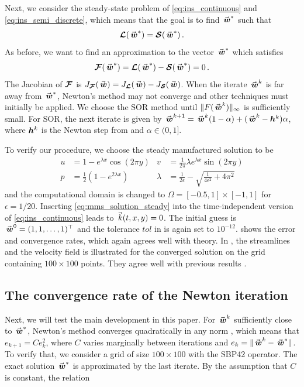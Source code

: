 Next, we consider the steady-state problem of \eqref{eq:ins_continuous} and \eqref{eq:ins_semi_discrete}, which means that the goal is to find $\wn^*$ such that
\begin{equation}
   \euln(\wn^*) = \satn(\wn^*)
   \, .
   \label{eq:ins_steady_state}
\end{equation}
As before, we want to find an approximation to the vector $\wn^*$ which satisfies
\begin{equation}
  \Fn (\wn^*) = \euln(\wn^*) - \satn(\wn^*) = 0  
  \, .
  \label{eq:F_steady_state}
\end{equation}
The Jacobian of $\bm{\mathcal{F}}$ is $J_{\Fn}(\wn) = J_{\euln}(\wn) - J_{\satn}(\wn)$. 
When the iterate $\wn^k$ is far away from $\wn^*$, Newton's method may not converge and other techniques must initially be applied. We choose the SOR method \cite{quarteroni2010numerical} 
until $\|F(\wn^k)\|_\infty$ is sufficiently small. For SOR, the next iterate is given by $\wn^{k+1} = \wn^k(1-\alpha) + (\wn^k - \hn^k)\alpha$, where $\bm{h}^k$ is the Newton step from  and $\alpha \in (0,1]$.

To verify our procedure, we choose the steady manufactured solution to be \cite{kovasznay1948laminar} 
\begin{equation}
  \begin{aligned}
    u & = 1-e^{\lambda x} \cos(2\pi y)
    & v & = \frac{1}{2 \pi}\lambda e^{\lambda x}\sin(2\pi y)
    \\
    p & = \frac{1}{2}\left(1 - e^{2\lambda x}\right)
    & \lambda & = \frac{1}{2 \epsilon} - \sqrt{\frac{1}{4 \epsilon^2} + 4 \pi^2}
 \end{aligned}
 \label{eq:mms_solution_steady}
\end{equation}
and the computational domain is changed to $\Omega = [-0.5,1]\times [-1,1]$ for $\epsilon = 1/20$. Inserting \eqref{eq:mms_solution_steady} into the time-independent version of \eqref{eq:ins_continuous} leads to $\vecs{k}(t,x,y) = 0$. The initial guess is $\wn^0 = (1,1, \dots, 1)^\top$ and the tolerance $tol$ in  is again set to $10^{-12}$. 
 shows the error and convergence rates, which again agrees well with theory. In , the streamlines and the velocity field is illustrated for the converged solution on the grid containing $100\times 100$ points. They agree well with previous results \cite{kovasznay1948laminar}. 

\subsection{The convergence rate of the Newton iteration}
Next, we will test the main development in this paper. For $\wn^k$ sufficiently close to $\wn^*$, Newton's method converges quadratically in any norm \cite{quarteroni2010numerical}, which means that $e_{k+1} = C e_k^2$, where $C$ varies marginally between iterations and $e_k = \|\wn^k - \wn^*\|$. To verify that, we consider a grid of size $100\times 100$ with the SBP42 operator. The exact solution $\wn^*$ is approximated by the last iterate. By the assumption that $C$ is constant, the relation

